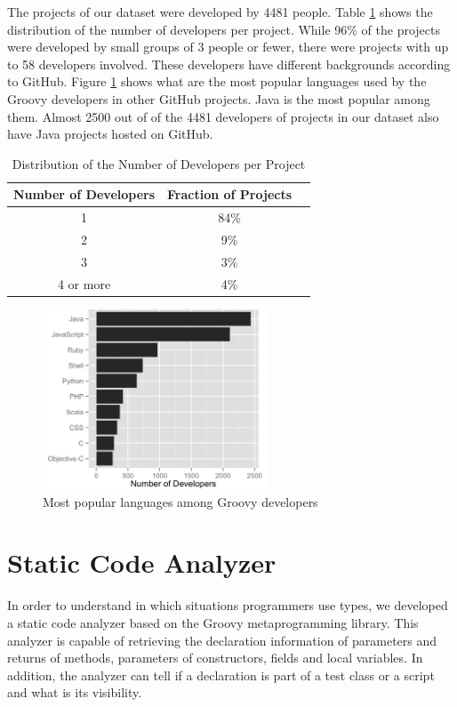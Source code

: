 \documentclass[msc]{ppgccufmg}
\begin{document}
The projects of our dataset were developed by 4481 people.
Table \ref{tab:number_of_developers} shows the distribution of the number of developers per project.
While 96\% of the projects were developed by small groups of 3 people or fewer, there were projects with up to 58 developers involved.
These developers have different backgrounds according to GitHub.
Figure \ref{fig:other_languages} shows what are the most popular languages used by the Groovy developers in other GitHub projects. 
Java is the most popular among them.
Almost 2500 out of  of the 4481 developers of projects in our dataset also have Java projects hosted on GitHub.

\begin{table}[ht]
\caption{Distribution of the Number of Developers per Project}
\centering{}%
\begin{tabular}{|c|c|c|}
\hline 
Number of Developers & Fraction of Projects\tabularnewline
\hline 
\hline 
1 & 84\%\tabularnewline
\hline 
2 & 9\%\tabularnewline
\hline 
3 & 3\%\tabularnewline
\hline 
4 or more & 4\%\tabularnewline
\hline 
\end{tabular}
\label{tab:number_of_developers}
\end{table}


\begin{figure}[h!]
\centering \includegraphics[width=0.6\textwidth]{../aosd_2014/analysis/result/languages.png}
\caption{Most popular languages among Groovy developers}
\label{fig:other_languages} 
\end{figure}



\section{Static Code Analyzer\label{analyzer}}
In order to understand in which situations programmers use types, we developed a static code analyzer based on the Groovy metaprogramming library.
This analyzer is capable of retrieving the declaration information of parameters and returns of methods, parameters of constructors, fields and local variables.
In addition, the analyzer can tell if a declaration is part of a test class or a script and what is its visibility.
\end{document}
